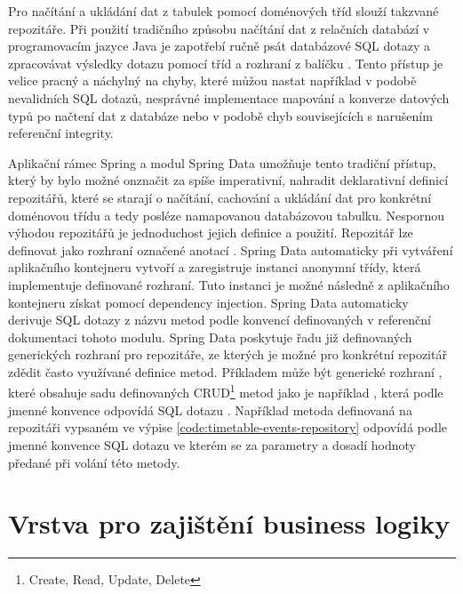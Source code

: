 Pro načítání a ukládání dat z tabulek pomocí doménových tříd slouží takzvané repozitáře. Při použití tradičního způsobu načítání dat z relačních databází v programovacím jazyce Java je zapotřebí ručně psát databázové SQL dotazy a zpracovávat výsledky dotazu pomocí tříd a rozhraní z balíčku . Tento přístup je velice pracný a náchylný na chyby, které můžou nastat například v podobě nevalidních SQL dotazů, nesprávné implementace mapování a konverze datových typů po načtení dat z databáze nebo v podobě chyb souvisejících s narušením referenční integrity. 

Aplikační rámec Spring a modul Spring Data umožňuje tento tradiční přístup, který by bylo možné onznačit za spíše imperativní, nahradit deklarativní definicí repozitářů, které se starají o načítání, cachování a ukládání dat pro konkrétní doménovou třídu a tedy posléze namapovanou databázovou tabulku. Nespornou výhodou repozitářů je jednoduchost jejich definice a použití. Repozitář lze definovat jako rozhraní označené anotací . Spring Data automaticky při vytváření aplikačního kontejneru vytvoří a zaregistruje instanci anonymní třídy, která implementuje definované rozhraní. Tuto instanci je možné následně z aplikačního kontejneru získat pomocí dependency injection. Spring Data automaticky derivuje SQL dotazy z názvu metod podle konvencí definovaných v referenční dokumentaci tohoto modulu. Spring Data poskytuje řadu již definovaných generických rozhraní pro repozitáře, ze kterých je možné pro konkrétní repozitář zdědit často využívané definice metod. Příkladem může být generické rozhraní , které obsahuje sadu definovaných CRUD\footnote{Create, Read, Update, Delete} metod jako je například , která podle jmenné konvence odpovídá SQL dotazu . Například metoda  definovaná na repozitáři  vypsaném ve výpise \ref{code:timetable-events-repository} odpovídá podle jmenné konvence SQL dotazu  ve kterém se za parametry  a  dosadí hodnoty předané při volání této metody.


\section{Vrstva pro zajištění business logiky}

